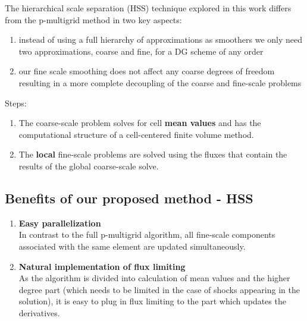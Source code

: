 \documentclass[mathserif]{beamer}
\begin{document}
\begin{frame}

The hierarchical scale separation (HSS) technique explored in this work
differs from the p-multigrid method in two key aspects:
\begin{enumerate}
\item instead of using a full hierarchy of approximations as smoothers we only need two approximations, coarse and fine, for a DG scheme of any order
\item our fine scale smoothing does not affect any coarse degrees of freedom resulting in a more complete decoupling of the coarse and fine-scale problems
\end{enumerate}

Steps:\ \\

\begin{enumerate}
\item The coarse-scale problem solves for cell \textbf{mean values} and has the computational structure of a cell-centered finite volume method.
\item The \textbf{local} fine-scale problems are solved using the fluxes that contain the results of the global coarse-scale solve.
\end{enumerate}

\end{frame}

\subsection{Benefits of our proposed method - HSS}
\begin{frame}
\begin{enumerate}
\item {\large \textbf{Easy parallelization}}\ \\
In contrast to the full p-multigrid algorithm, all fine-scale components associated with the same element are updated simultaneously.

\item {\large \textbf{Natural implementation of flux limiting}}\ \\
As the algorithm is divided into calculation of mean values and the higher degree part (which needs to be limited in the case of shocks appearing in the solution), it is easy to plug in flux limiting to the part which updates the derivatives.
\end{enumerate}

\end{frame}
\end{document}
